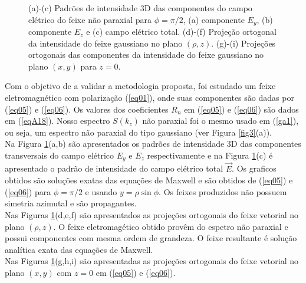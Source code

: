 \begin{figure}[h]
\caption{(a)-(c) Padr\~oes de intensidade 3D das componentes do campo el\'etrico do feixe n\~ao paraxial para $\phi=\pi/2$, (a) componente $E_y$, (b) componente $E_z$ e (c) campo el\'etrico total. (d)-(f) Proje\c{c}\~ao ortogonal da intensidade do feixe gaussiano no plano $(\rho,z)$.  (g)-(i) Proje\c{c}\~oes ortogonais das componentes da intensidade do feixe gaussiano no plano $(x,y)$ para $z=0$. }
\label{fig5}
\end{figure}
Com o objetivo de a validar a metodologia proposta, foi estudado um feixe eletromagn\'etico com polariza\c{c}\~ao (\ref{eq01}), onde suas componentes s\~ao dadas por (\ref{eq05}) e (\ref{eq06}). Os valores dos coeficientes $R_n$ em (\ref{eq05}) e (\ref{eq06}) s\~ao dados em (\ref{eqA18}). Nosso espectro $S(k_z)$ n\~ao paraxial foi o mesmo usado em (\ref{ga1}), ou seja, um espectro n\~ao paraxial do tipo gaussiano (ver Figura \ref{fig3}(a)).\\
Na Figura \ref{fig5}(a,b) s\~ao apresentados os padr\~oes de intensidade 3D das componentes transversais do campo el\'etrico $E_y$  e $E_z$ respectivamente  e na Figura \ref{fig5}(c) \'e apresentado o padr\~ao de intensidade do campo el\'etrico total $\vec{E}$.  Os graficos obtidos s\~ao solu\c{c}\~oes exatas das equa\c{c}\~oes de Maxwell e s\~ao obtidos de (\ref{eq05}) e (\ref{eq06}) para $\phi=\pi/2$ e usando $y = \rho\sin\phi$. Os feixes produzidos n\~ao possuem simetria azimutal e s\~ao propagantes.\\
Nas Figuras \ref{fig5}(d,e,f) s\~ao apresentados as proje\c{c}\~oes ortogonais do feixe vetorial no plano $(\rho,z)$.  O feixe eletromag\'etico obtido prov\^em do espetro n\~ao paraxial e possui componentes com mesma ordem de grandeza. O feixe resultante \'e solu\c{c}\~ao anal\'itica exata das equa\c{c}\~oes de Maxwell.\\
Nas Figuras \ref{fig5}(g,h,i) s\~ao apresentadas as proje\c{c}\~oes ortogonais do feixe vetorial no plano $(x,y)$ com $z=0$ em (\ref{eq05}) e (\ref{eq06}).\\
